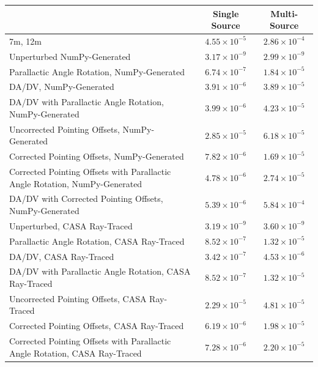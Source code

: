 \documentclass[11pt]{article}
\begin{document}
\begin{table}
    \centering
    \begin{tabular}{|p{8cm}|c|c|}
    \hline
    & Single Source & Multi-Source  \\
    \hline
    7m, 12m & $4.55 \times 10^{-5}$ & $2.86 \times 10^{-4}$ \\
    \hline
    Unperturbed NumPy-Generated & $3.17 \times 10^{-9}$ & $2.99 \times
    10^{-9}$ \\
    \hline
    Parallactic Angle Rotation, NumPy-Generated & $6.74 \times 10^{-7}$ &
    $1.84 \times 10^{-5}$ \\
    \hline
    DA/DV, NumPy-Generated & $3.91 \times 10^{-6}$ & $3.89 \times 10^{-5}$ \\
    \hline
    DA/DV with Parallactic Angle Rotation, NumPy-Generated & $3.99 \times
    10^{-6}$ & $4.23 \times 10^{-5}$ \\
    \hline
    Uncorrected Pointing Offsets, NumPy-Generated & $2.85 \times 10^{-5}$ &
    $6.18 \times 10^{-5}$ \\
    \hline
    Corrected Pointing Offsets, NumPy-Generated & $7.82 \times 10^{-6}$ &
    $1.69 \times 10^{-5}$ \\
    \hline
    Corrected Pointing Offsets with Parallactic Angle Rotation,
    NumPy-Generated & $4.78 \times 10^{-6}$ & $2.74 \times 10^{-5}$ \\
    \hline
    DA/DV with Corrected Pointing Offsets, NumPy-Generated & $5.39 \times
    10^{-6}$ & $5.84 \times 10^{-4}$ \\
    \hline
    Unperturbed, CASA Ray-Traced& $3.19 \times 10^{-9}$ & $3.60 \times
    10^{-9}$ \\
    \hline
    Parallactic Angle Rotation, CASA Ray-Traced & $8.52 \times 10^{-7}$ &
    $1.32 \times 10^{-5}$ \\
    \hline
    DA/DV, CASA Ray-Traced & $3.42 \times 10^{-7}$ & $4.53 \times 10^{-6}$ \\
    \hline
    DA/DV with Parallactic Angle Rotation, CASA Ray-Traced & $8.52 \times
    10^{-7}$ & $1.32 \times 10^{-5}$ \\
    \hline
    Uncorrected Pointing Offsets, CASA Ray-Traced & $2.29 \times 10^{-5}$ &
    $4.81 \times 10^{-5}$ \\
    \hline
    Corrected Pointing Offsets, CASA Ray-Traced & $6.19 \times 10^{-6}$ &
    $1.98 \times 10^{-5}$ \\
    \hline
    Corrected Pointing Offsets with Parallactic Angle Rotation, CASA
    Ray-Traced & $7.28 \times 10^{-6}$ & $2.20 \times 10^{-5}$ \\

\end{tabular}
\end{table}
\end{document}

